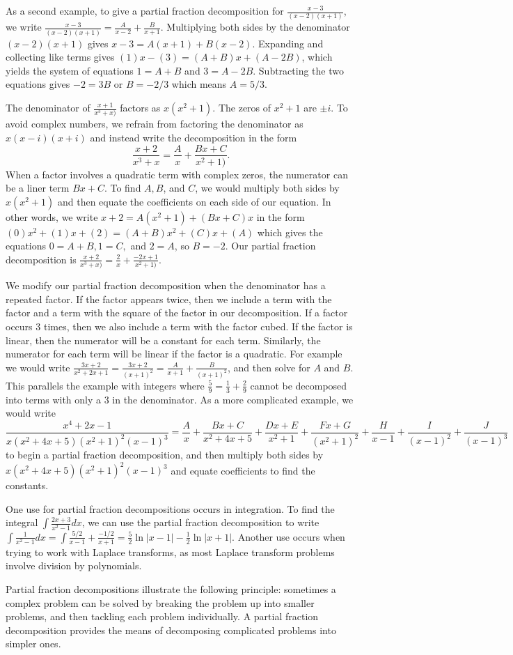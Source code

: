\documentclass[10pt]{article}
\begin{document}
As a second example, to give a partial fraction decomposition for $\frac{x-3}{(x-2)(x+1)}$, we write  
$\frac{x-3}{(x-2)(x+1)} = \frac{A}{x-2}+ \frac{B}{x+1} $. Multiplying both sides by the denominator $(x-2)(x+1)$ gives $x-3 = A(x+1)+B(x-2)$.  Expanding and collecting like terms gives $(1)x-(3) = (A+B)x+(A-2B)$, which yields the system of equations $1=A+B$ and $3=A-2B$.  Subtracting the two equations gives $-2=3B$ or $B=-2/3$ which means $A=5/3$.

The denominator of $\frac{x+1}{x^3+x)}$ factors as $x(x^2+1)$. The zeros of $x^2+1$ are $\pm i$. To avoid complex numbers, we refrain from factoring the denominator as $x(x-i)(x+i)$ and instead write the decomposition in the form 
$$\frac{x+2}{x^3+x} = \frac{A}{x}+\frac{Bx+C}{x^2+1)}.$$ When a factor involves a quadratic term with complex zeros, the numerator can be a liner term $Bx+C$. To find $A,B$, and $C$, we would multiply both sides by  $x(x^2+1)$ and then equate the coefficients on each side of our equation. In other words, we write $x+2 = A(x^2+1)+(Bx+C)x$ in the form $(0)x^2 + (1) x+(2) = (A+B)x^2+(C)x+(A)$ which gives the equations $0=A+B, 1=C, $ and $2=A$, so $B=-2$.  Our partial fraction decomposition is $\frac{x+2}{x^3+x)} = \frac{2}{x}+\frac{-2x+1}{x^2+1)}.$

We modify our partial fraction decomposition when the denominator has a repeated factor. If the factor appears twice, then we include a term with the factor and a term with the square of the factor in our decomposition.  If a factor occurs 3 times, then we also include a term with the factor cubed. If the factor is linear, then the numerator will be a constant for each term. Similarly, the numerator for each term will be linear if the factor is a quadratic. 
For example we would write $\frac{3x+2}{x^2+2x+1} = \frac{3x+2}{(x+1)^2} = \frac{A}{x+1}+\frac{B}{(x+1)^2}$, and then solve for $A$ and $B$. This parallels the example with integers where $\frac{5}{9} = \frac{1}{3}+\frac{2}{9}$ cannot be decomposed into terms with only a 3 in the denominator.  As a more complicated example, we would write 
$$\frac{x^4+2x-1}{x(x^2+4x+5)(x^2+1)^2(x-1)^3} =
\frac{A}{x}+
\frac{Bx+C}{x^2+4x+5}+
\frac{Dx+E}{x^2+1}+
\frac{Fx+G}{(x^2+1)^2}+
\frac{H}{x-1}+
\frac{I}{(x-1)^2}+
\frac{J}{(x-1)^3}$$ 
to begin a partial fraction decomposition, and then multiply both sides by $x(x^2+4x+5)(x^2+1)^2(x-1)^3$ and equate coefficients to find the constants.


One use for partial fraction decompositions occurs in integration. To find the integral 
$\int \frac{2x+3}{x^2-1} dx$, 
we can use the partial fraction decomposition to write 
$\int \frac{1}{x^2-1} dx
=\int\frac{5/2}{x-1}+\frac{-1/2}{x+1} = \frac52\ln|x-1|-\frac12\ln|x+1|$. Another use occurs when trying to work with Laplace transforms, as most Laplace transform problems involve division by polynomials. 

Partial fraction decompositions illustrate the following principle: sometimes a complex problem can be solved by breaking the problem up into smaller problems, and then tackling each problem individually.  A partial fraction decomposition provides the means of decomposing complicated problems into simpler ones.
\end{document}
